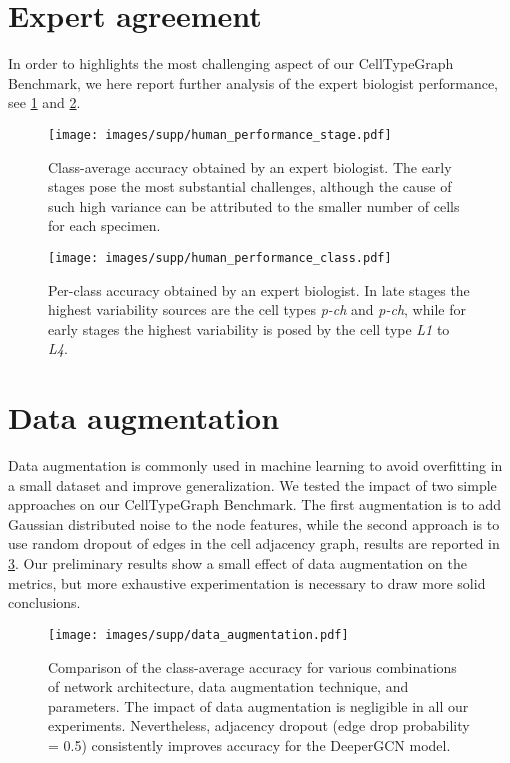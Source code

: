 \documentclass[10pt,twocolumn,letterpaper]{article}
\begin{document}
\section{Expert agreement}
\label{suppl:experts}
In order to highlights the most challenging aspect of our CellTypeGraph Benchmark, we here report further analysis of the expert biologist performance, see \cref{fig:hp_stage} and \cref{fig:hp_class}.
\begin{figure}
  \centering
  \texttt{[image: images/supp/human\_performance\_stage.pdf]}
  \caption{Class-average accuracy obtained by an expert biologist. The early stages pose the most substantial challenges, although the cause of such high variance can be attributed to the smaller number of cells for each specimen.}
  \label{fig:hp_stage}
\end{figure}

\begin{figure}
  \centering
  \texttt{[image: images/supp/human\_performance\_class.pdf]}
  \caption{Per-class accuracy obtained by an expert biologist. In late stages the highest variability sources are the cell types \textit{p-ch} and \textit{p-ch}, while for early stages the highest variability is posed by the cell type \textit{L1} to \textit{L4}.}
  \label{fig:hp_class}
\end{figure}

\section{Data augmentation}
\label{suppl:data_aug}
Data augmentation is commonly used in machine learning to avoid overfitting in a small dataset and improve generalization. We tested the impact of two simple approaches on our CellTypeGraph Benchmark. The first augmentation is to add Gaussian distributed noise to the node features, while the second approach is to use random dropout of edges in the cell adjacency graph, results are reported in \cref{fig:data_aug}. Our preliminary results show a small effect of data augmentation on the metrics, but more exhaustive experimentation is necessary to draw more solid conclusions.

\begin{figure}
  \centering
  \texttt{[image: images/supp/data\_augmentation.pdf]}
  \caption{Comparison of the class-average accuracy for various combinations of network architecture, data augmentation technique, and parameters. The impact of data augmentation is negligible in all our experiments. Nevertheless, adjacency dropout (edge drop probability = 0.5) consistently improves accuracy for the DeeperGCN model.}
  \label{fig:data_aug}
\end{figure}
\end{document}
